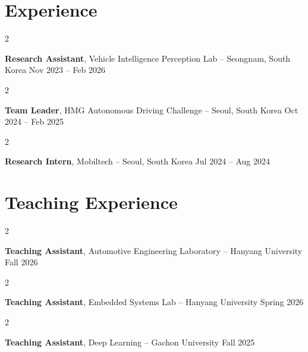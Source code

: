 \documentclass[10pt, letterpaper]{article}
\newenvironment{twocolentry}[2][]{
    \onecolentry
    \def\secondColumn{#2}
    \setcolumnwidth{\fill, 4.5 cm}
    \begin{paracol}{2}
}{
    \switchcolumn \raggedleft \secondColumn
    \end{paracol}
    \endonecolentry
} %
\begin{document}
    \section{Experience}
        \begin{twocolentry}{
            Nov 2023 – Feb 2026
        }
            \textbf{Research Assistant}, Vehicle Intelligence Perception Lab -- Seongnam, South Korea\end{twocolentry}

        \vspace{0.2 cm}

        \begin{twocolentry}{
            Oct 2024 – Feb 2025
        }
            \textbf{Team Leader}, HMG Autonomous Driving Challenge -- Seoul, South Korea\end{twocolentry}

        \vspace{0.2 cm}

        \begin{twocolentry}{
            Jul 2024 – Aug 2024
        }
            \textbf{Research Intern}, Mobiltech -- Seoul, South Korea\end{twocolentry}

    \section{Teaching Experience}

        \begin{twocolentry}{
            Fall 2026
        }
            \textbf{Teaching Assistant}, Automotive Engineering Laboratory -- Hanyang University\end{twocolentry}

        \vspace{0.2 cm}

        \begin{twocolentry}{
            Spring 2026
        }
            \textbf{Teaching Assistant}, Embedded Systems Lab -- Hanyang University\end{twocolentry}

        \vspace{0.2 cm}

        \begin{twocolentry}{
            Fall 2025
        }
            \textbf{Teaching Assistant}, Deep Learning -- Gachon University\end{twocolentry}
\end{document}
